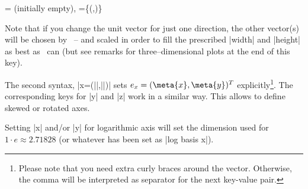 \begin{pgfplotsxykeylist}{
	\x= (initially empty),
	\x={\{(,)\}}}
\begin{codeexample}[]
\end{codeexample}

Note that if you change the unit vector for just one direction, the other vector(s) will be chosen by \PGFPlots\ -- and scaled in order to fill the prescribed |width| and |height| as best as \PGFPlots\ can (but see remarks for three--dimensional plots at the end of this key).
\begin{codeexample}[]
\end{codeexample}

The second syntax, |x={(||,||)}| sets $e_x = (\meta{x},\meta{y})^T$ explicitly\footnote{Please note that you need extra curly braces around the vector. Otherwise, the comma will be interpreted as separator for the next key-value pair.}. The corresponding keys for |y| and |z| work in a similar way. This allows to define skewed or rotated axes.

\begin{codeexample}[]
\end{codeexample}

\begin{codeexample}[]
\end{codeexample}


	Setting |x| and/or |y| for logarithmic axis will set the dimension used for $1 \cdot e \approx 2.71828$ (or whatever has been set as |log basis x|).


\end{pgfplotsxykeylist}
